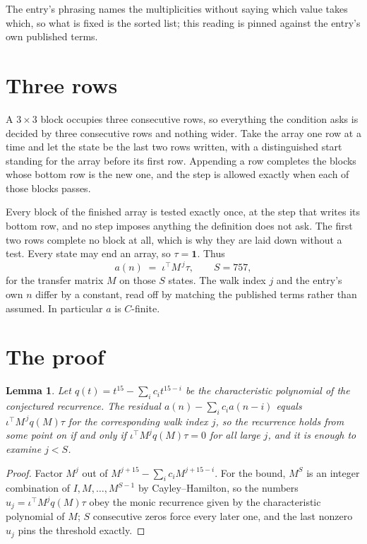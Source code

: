 \documentclass[11pt,a4paper]{article}
\theoremstyle{plain}
\newtheorem{lemma}[theorem]{Lemma}
\theoremstyle{definition}
\begin{document}
The entry's phrasing names the multiplicities without saying which value takes which, so what is fixed is the sorted list; this reading is pinned against the entry's own published terms.

\section{Three rows}

A $3\times3$ block occupies three consecutive rows, so everything the condition asks is decided
by three consecutive rows and nothing wider. Take the array one row at a time and let the state
be the last two rows written, with a distinguished start standing for the array before its
first row. Appending a row completes the blocks whose bottom row is the new one, and the step
is allowed exactly when each of those blocks passes.

Every block of the finished array is tested exactly once, at the step that writes its bottom
row, and no step imposes anything the definition does not ask. The first two rows complete no
block at all, which is why they are laid down without a test. Every state may end an array, so
$\tau=\mathbf{1}$. Thus
\[
a(n)\;=\;\iota^{\!\top}M^{\,j}\tau ,\qquad S=757,
\]
for the transfer matrix $M$ on those $S$ states. The walk index $j$ and the entry's own $n$
differ by a constant, read off by matching the published terms rather than assumed. In
particular $a$ is $C$-finite.

\section{The proof}

\begin{lemma}\label{lem:crit}
Let $q(t)=t^{15}-\sum_i c_it^{15-i}$ be the characteristic polynomial of the
conjectured recurrence. The residual $a(n)-\sum_ic_ia(n-i)$ equals
$\iota^{\!\top}M^{\,j}q(M)\tau$ for the corresponding walk index $j$, so the recurrence
holds from some point on if and only if $\iota^{\!\top}M^{j}q(M)\tau=0$ for all large $j$,
and it is enough to examine $j<S$.
\end{lemma}

\begin{proof}
Factor $M^{j}$ out of $M^{j+15}-\sum_ic_iM^{j+15-i}$. For the bound, $M^{S}$
is an integer combination of $I,M,\dots,M^{S-1}$ by Cayley--Hamilton, so the numbers
$u_j=\iota^{\!\top}M^{j}q(M)\tau$ obey the monic recurrence given by the characteristic
polynomial of $M$; $S$ consecutive zeros force every later one, and the last nonzero $u_j$
pins the threshold exactly.
\end{proof}
\end{document}
